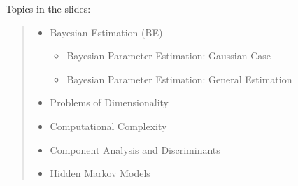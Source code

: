 


Topics in the slides:
\begin{quote}
	\begin{itemize}
		\item Bayesian Estimation (BE)
		\begin{itemize}
				\item Bayesian Parameter Estimation: Gaussian Case
				\item Bayesian  Parameter Estimation: General Estimation 
		\end{itemize}
		\item Problems of Dimensionality 
		\item Computational Complexity 
		\item Component Analysis and Discriminants
		\item Hidden Markov Models
	\end{itemize}
	
\end{quote}


